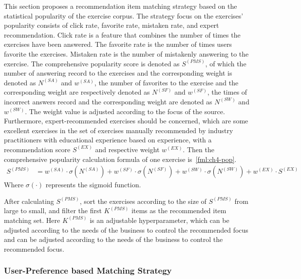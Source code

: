 This section proposes a recommendation item matching strategy based on the statistical popularity of the exercise corpus. The strategy focus on the exercises' popularity consists of click rate, favorite rate, mistaken rate, and expert recommendation. Click rate is a feature that combines the number of times the exercises have been answered. The favorite rate is the number of times users favorite the exercises. Mistaken rate is the number of mistakenly answering to the exercise. The comprehensive popularity score is denoted as \(S^{(PMS)}\), of which the number of answering record to the exercises and the corresponding weight is denoted as \(N^{(SA)}\) and \(w^{(SA)}\), the number of favorites to the exercise and the corresponding weight are respectively denoted as \(N^{(SF)}\) and \(w^{(SF)} \), the times of incorrect answers record and the corresponding weight are denoted as \(N^{(SW)}\) and \(w^{(SW)}\). The weight value is adjusted according to the focus of the source. Furthermore, expert-recommended exercises should be concerned, which are some excellent exercises in the set of exercises manually recommended by industry practitioners with educational experience based on experience, with a recommendation score \(S^{(EX)}\) and respective weight \(w^{(EX)}\). Then the comprehensive popularity calculation formula of one exercise is~\ref{fml:ch4-pop}.
\begin{align}
  S^{(PMS)} & = w^{(SA)}\cdot \sigma(N^{(SA)})+w^{(SF)}\cdot\sigma(N^{(SF)})+w^{(SW)}\cdot\sigma(N^{(SW)})+w^{(EX)}\cdot S^{(EX)}\label{fml:ch4-pop}
\end{align}
Where \(\sigma(\cdot)\) represents the sigmoid function.

After calculating \(S^{(PMS)}\), sort the exercises according to the size of \(S^{(PMS)}\) from large to small, and filter the first \(K^{(PMS)}\) items as the recommended item matching set. Here \(K^{(PMS)}\) is an adjustable hyperparameter, which can be adjusted according to the needs of the business to control the recommended focus and can be adjusted according to the needs of the business to control the recommended focus.

\subsubsection{User-Preference based Matching Strategy}

